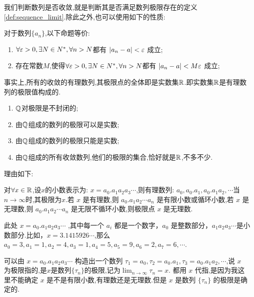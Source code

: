 我们判断数列是否收敛,就是判断其是否满足数列极限存在的定义\ref{def:sequence_limit}.除此之外,也可以使用如下的性质:

\begin{proposition}\label{prop:sequence_limit_equivalence}
    对于数列$\{a_n\}$,以下命题等价:

    \begin{enumerate}
        \item $\forall \varepsilon >0, \exists N\in N^*, \forall n>N $都有 $|a_n-a|<\varepsilon$ 成立;
        \item 存在常数$M$,使得$\forall \varepsilon >0, \exists N\in N^*, \forall n>N $都有 $|a_n-a|<M \varepsilon$ 成立;
    \end{enumerate}
\end{proposition}

事实上,所有的收敛的有理数列,其极限点的全体即是实数集$\mathbb{R}$.即实数集$\mathbb{R}$是有理数列的极限值构成的.


\begin{remark}
    \begin{enumerate}
        \item $\mathbb{Q}$对极限是不封闭的;
        \item 由$\mathbb{Q}$组成的数列的极限可以是实数;
        \item 由$\mathbb{Q}$组成的数列的极限只能是实数;
        \item 由$\mathbb{Q}$组成的所有收敛数列,他们的极限的集合,恰好就是$\mathbb{R}$,不多不少.
    \end{enumerate}

    理由如下:

对$\forall x\in \mathbb{R}$,设$x$的小数表示为: $x=a_0 . a_1 a_2 a_3 \cdots$,则有理数列: $a_0, a_0 . a_1, a_0 . a_1 a_2, \cdots$当$n\rightarrow \infty$时,其极限为$x$.若 $x$ 是有理数,则 $a_0 . a_1 a_2 \cdots a_n$ 是有限小数或循环小数,若 $x$ 是无理数,则 $a_0 . a_1 a_2 \cdots a_n$ 是无限不循环小数,则极限点 $x$ 是无理数.

    此处 $x=a_0 . a_1 a_2 a_3 \cdots$ ,其中每一个 $a_i$ 都是一个数字，$a_0$ 是整数部分，$a_1 a_2 a_3 \cdots$是小数部分.比如，$x=3.1415926\cdots$,那么 $a_0=3, a_1=1, a_2=4, a_3=1, a_4=5, a_5=9, a_6=2, a_7=6,\cdots$.

    可以由 $x=a_0 . a_1 a_2 a_3 \cdots$ 构造出一个数列 $\tau_1 = a_0, \tau_2 = a_0 . a_1, \tau_3 = a_0 . a_1 a_2, \cdots$,说 $x$ 为极限指的,是$x$是数列$\{\tau_n\}$的极限,记为$\lim_{n \to \infty} \tau_n = x$.
    都用 $x$ 代指,是因为我这里不能确定 $x$ 是不是有限小数,有理数还是无理数.但是 $x$ 是数列 $\{\tau_n\}$ 的极限是确定的.


\end{remark}

